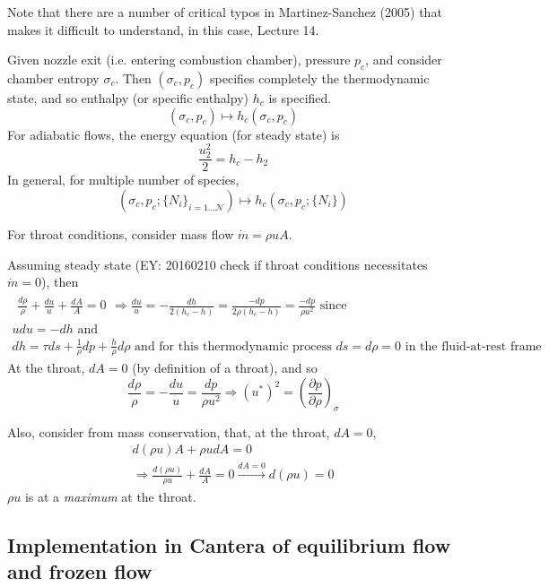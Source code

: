 \documentclass[10pt]{amsart}
\begin{document}
\begin{multicols*}{2}
Note that there are a number of critical typos in Martinez-Sanchez (2005) \cite{MMartinez-Sanchez2005} that makes it difficult to understand, in this case, Lecture 14.  

Given nozzle exit (i.e. entering combustion chamber), pressure $p_c$, and consider chamber entropy $\sigma_c$.  Then $(\sigma_c,p_c)$ specifies completely the thermodynamic state, and so enthalpy (or specific enthalpy) $h_c$ is specified.  
\[
(\sigma_c, p_c) \mapsto h_c(\sigma_c,p_c)
\]
For adiabatic flows, the energy equation (for steady state) is
\[
\frac{u_2^2}{2} = h_c - h_2
\]
In general, for multiple number of species, 
\[
(\sigma_c, p_c; \lbrace N_i \rbrace_{i=1 \dots \mathcal{N} } ) \mapsto h_c(\sigma_c,p_c; \lbrace N_i \rbrace)
\]

For throat conditions, consider mass flow $\dot{m} = \rho uA$.  

Assuming steady state (EY: 20160210 check if throat conditions necessitates $\dot{m}=0$), then 
\[
\begin{gathered}
  \begin{gathered}
  \frac{d\rho}{\rho} + \frac{du}{u } + \frac{dA}{A} = 0 
  \end{gathered} \Longrightarrow \frac{du}{u} = -\frac{dh}{ 2(h_c - h) } = \frac{-dp}{2 \rho (h_c- h) } = \frac{-dp }{ \rho u^2} \text{ since } \\
  u du = -dh \text{ and } \\
  dh = \tau ds + \frac{1}{\rho } dp + \frac{h}{\rho} d\rho \text{ and for this thermodynamic process $ds=d\rho =0$ in the fluid-at-rest frame }
\end{gathered}
\]
At the throat, $dA=0$ (by definition of a throat), and so \[
\frac{d\rho }{ \rho } = -\frac{du}{u} = \frac{dp}{\rho u^2} \Longrightarrow (u^*)^2 = \left( \frac{ \partial p}{ \partial \rho} \right)_{\sigma}
\]

Also, consider from mass conservation, that, at the throat, $dA =0$, 
\[
\begin{gathered}
  d(\rho u )A + \rho u dA = 0 \\
  \Longrightarrow \frac{d(\rho u)}{ \rho u} + \frac{dA}{A} = 0 \xrightarrow{ dA = 0 } d(\rho u)=0
\end{gathered}
\]
$\rho u$ is at a \emph{maximum} at the throat.  

\subsection{Implementation in Cantera of equilibrium flow and frozen flow}


\end{multicols*}
\end{document}
